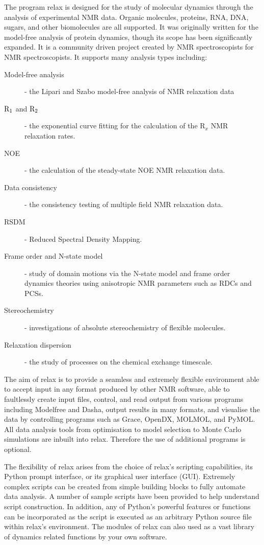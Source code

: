 The program relax is designed for the study of molecular dynamics through the analysis of experimental NMR data.
Organic molecules, proteins, RNA, DNA, sugars, and other biomolecules are all supported.
It was originally written for the model-free analysis of protein dynamics, though its scope has been significantly expanded.
It is a community driven project created by NMR spectroscopists for NMR spectroscopists.
It supports many analysis types including:
\begin{description}
  \item[Model-free analysis] - the Lipari and Szabo model-free analysis of NMR relaxation data
  \item[$\mathrm{R}_1$ and $\mathrm{R}_2$] - the exponential curve fitting for the calculation of the R$_x$ NMR relaxation rates.
  \item[NOE] - the calculation of the steady-state NOE NMR relaxation data.
  \item[Data consistency] - the consistency testing of multiple field NMR relaxation data.
  \item[RSDM] - Reduced Spectral Density Mapping.
  \item[Frame order and N-state model] - study of domain motions via the N-state model and frame order dynamics theories using anisotropic NMR parameters such as RDCs and PCSs.
  \item[Stereochemistry] - investigations of absolute stereochemistry of flexible molecules.
  \item[Relaxation dispersion] - the study of processes on the chemical exchange timescale.
\end{description}

The aim of relax is to provide a seamless and extremely flexible environment able to accept input in any format produced by other NMR software, able to faultlessly create input files, control, and read output from various programs including Modelfree and Dasha, output results in many formats, and visualise the data by controlling programs such as Grace, OpenDX, MOLMOL, and PyMOL.
All data analysis tools from optimisation to model selection to Monte Carlo simulations are inbuilt into relax.
Therefore the use of additional programs is optional.

The flexibility of relax arises from the choice of relax's scripting capabilities, its Python prompt interface, or its graphical user interface (GUI).
Extremely complex scripts can be created from simple building blocks to fully automate data analysis.
A number of sample scripts have been provided to help understand script construction.
In addition, any of Python's powerful features or functions can be incorporated as the script is executed as an arbitrary Python source file within relax's environment.
The modules of relax can also used as a vast library of dynamics related functions by your own software.

